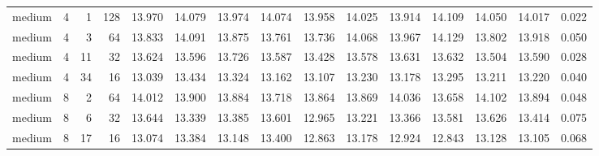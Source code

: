 {\begin{longtable}{@{}lrrrrrrrrrrrrrr@{}}
medium & 4 & 1 & 128 & 13.970 & 14.079 & 13.974 & 14.074 & 13.958 & 14.025 & 13.914 & 14.109 & 14.050 & 14.017 & 0.022 \\
medium & 4 & 3 & 64 & 13.833 & 14.091 & 13.875 & 13.761 & 13.736 & 14.068 & 13.967 & 14.129 & 13.802 & 13.918 & 0.050 \\
medium & 4 & 11 & 32 & 13.624 & 13.596 & 13.726 & 13.587 & 13.428 & 13.578 & 13.631 & 13.632 & 13.504 & 13.590 & 0.028 \\
medium & 4 & 34 & 16 & 13.039 & 13.434 & 13.324 & 13.162 & 13.107 & 13.230 & 13.178 & 13.295 & 13.211 & 13.220 & 0.040 \\
medium & 8 & 2 & 64 & 14.012 & 13.900 & 13.884 & 13.718 & 13.864 & 13.869 & 14.036 & 13.658 & 14.102 & 13.894 & 0.048 \\
medium & 8 & 6 & 32 & 13.644 & 13.339 & 13.385 & 13.601 & 12.965 & 13.221 & 13.366 & 13.581 & 13.626 & 13.414 & 0.075 \\
medium & 8 & 17 & 16 & 13.074 & 13.384 & 13.148 & 13.400 & 12.863 & 13.178 & 12.924 & 12.843 & 13.128 & 13.105 & 0.068 \\
\end{longtable}
}

